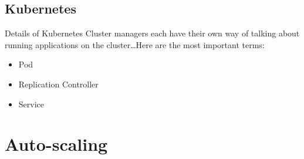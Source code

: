 \documentclass{beamer}
\begin{document}
\subsection{Kubernetes}

\begin{frame}{Details of Kubernetes}
  Cluster managers each have their own way of talking about running applications
  on the cluster\ldots Here are the most important terms:


  \begin{itemize}
    \item Pod

    \item Replication Controller
    \item Service
  \end{itemize}
\end{frame}

\section{Auto-scaling}

\end{document}
